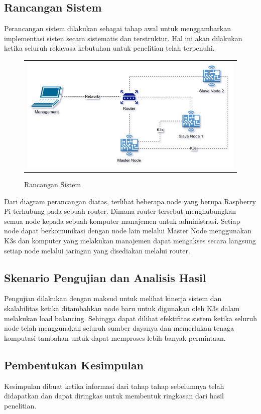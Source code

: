 \subsection{Rancangan Sistem}
Perancangan sistem dilakukan sebagai tahap awal untuk menggambarkan implementasi sisten secara sistematis dan terstruktur. Hal ini akan dilakukan ketika seluruh rekayasa kebutuhan untuk penelitian telah terpenuhi.
\begin{figure}[htb!]
    \centering
    \begin{tabular}{ @{} r @{} }
        \includegraphics[scale=0.6]{pictures/rancangan_sistem.png}\\
    \end{tabular}
    \caption{Rancangan Sistem}
\end{figure}
\FloatBarrier
\noindent
Dari diagram perancangan diatas, terlihat beberapa node yang berupa Raspberry Pi terhubung pada sebuah router. Dimana router tersebut menghubungkan semua node kepada sebuah komputer manajemen untuk administrasi. Setiap node dapat berkomunikasi dengan node lain melalui Master Node menggunakan K3s dan komputer yang melakukan manajemen dapat mengakses secara langsung setiap node melalui jaringan yang disediakan melalui router.
\subsection{Skenario Pengujian dan Analisis Hasil}
Pengujian dilakukan dengan maksud untuk melihat kinerja sistem dan skalabilitas ketika ditambahkan node baru untuk digunakan oleh K3s dalam melakukan load balancing. Sehingga dapat dilihat efektifitas sistem ketika seluruh node telah menggunakan seluruh sumber dayanya dan memerlukan tenaga komputasi tambahan untuk dapat memproses lebih banyak permintaan.

\subsection{Pembentukan Kesimpulan}
Kesimpulan dibuat ketika informasi dari tahap tahap sebelumnya telah didapatkan dan dapat diringkas untuk membentuk ringkasan dari hasil penelitian.